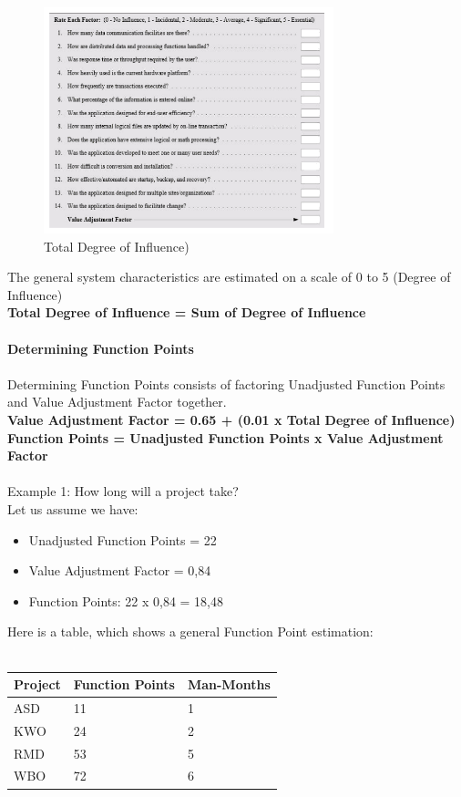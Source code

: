 \documentclass[
	11pt,
	a4paper
]{article}%
\begin{document}
\begin{figure}[h!]
  \caption{Total Degree of Influence)}
  \centering
    \includegraphics[width=0.75\textwidth]{../Images/FP_2.png}
\end{figure}
The general system characteristics are estimated on a scale of  0 to 5 (Degree of Influence)\\
\textbf{Total Degree of Influence = Sum of Degree of Influence}
\\\\
\textbf{Determining Function Points}\\\\
Determining Function Points consists of factoring Unadjusted Function Points and Value Adjustment Factor together.\\
\textbf{Value Adjustment Factor = 0.65 + (0.01 x Total Degree of Influence)}\\
\textbf{Function Points  = Unadjusted Function Points x Value Adjustment Factor}\\\\
Example 1: How long will a project take?\\
Let us assume we have:
\begin{itemize}
\item Unadjusted Function Points = 22
\item Value Adjustment Factor = 0,84
\item Function Points: 22 x 0,84 = 18,48
\end{itemize}
Here is a table, which shows a general Function Point estimation:\\\\
\begin{tabular}{|l|l|l|}
\hline
    \rowcolor{dunkelgrau}
	Project & Function Points 	& Man-Months 	\\ \hline
	ASD 	& 11 				& 1				\\ \hline
	KWO 	& 24 				& 2				\\ \hline
	RMD 	& 53 				& 5				\\ \hline
	WBO 	& 72 				& 6				\\ \hline
\end{tabular}\\\\
\end{document}
